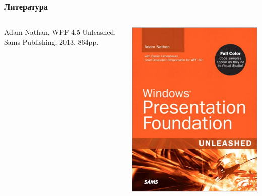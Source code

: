 \documentclass[xetex,mathserif,serif]{beamer}
\begin{document}
    \begin{frame}
        \frametitle{Литература}
        \begin{columns}
            \begin{column}{0.7\textwidth}
                Adam Nathan, WPF 4.5 Unleashed. Sams Publishing, 2013. 864pp.
                \vspace{3cm}
            \end{column}
            \begin{column}{0.3\textwidth}
                \begin{center}
                    \includegraphics[width=\textwidth]{wpfBookCover.png}
                \end{center}
            \end{column}
        \end{columns}
    \end{frame}
\end{document}
